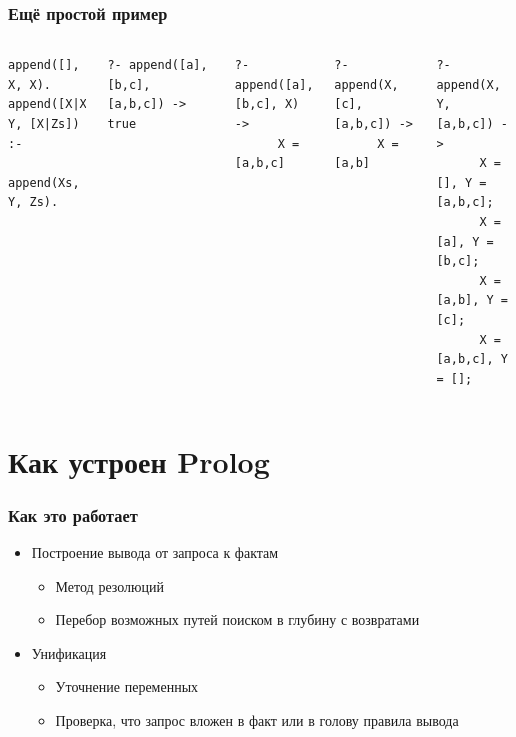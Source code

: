 \documentclass{../../slides-style}
\begin{document}
    \begin{frame}[fragile]
        \frametitle{Ещё простой пример}
        \begin{columns}
            \begin{verbatim}
append([], X, X).
append([X|Xs], Y, [X|Zs]) :-
  append(Xs, Y, Zs).
            \end{verbatim}
            \pause
            \vspace{2mm}
            \begin{verbatim}
?- append([a], [b,c], [a,b,c]) -> true
            \end{verbatim}
            \pause
            \vspace{2mm}
            \begin{verbatim}
?- append([a], [b,c], X) -> 
      X = [a,b,c]
            \end{verbatim}
            \pause
            \vspace{2mm}
            \begin{verbatim}
?- append(X, [c], [a,b,c]) ->
      X = [a,b]
            \end{verbatim}
            \pause
            \vspace{2mm}
            \begin{verbatim}
?- append(X, Y, [a,b,c]) ->
      X = [], Y = [a,b,c];
      X = [a], Y = [b,c];
      X = [a,b], Y = [c];
      X = [a,b,c], Y = [];
            \end{verbatim}
        \end{columns}
    \end{frame}

\section{Как устроен Prolog}

    \begin{frame}
        \frametitle{Как это работает} 
        \begin{itemize}
            \item Построение вывода от запроса к фактам 
            \begin{itemize}
                \item Метод резолюций
                \item Перебор возможных путей поиском в глубину с возвратами
            \end{itemize}
            \vspace{2mm}
            \item Унификация
            \begin{itemize}
                \item Уточнение переменных
                \item Проверка, что запрос вложен в факт или в голову правила вывода
            \end{itemize}
        \end{itemize}
    \end{frame}
\end{document}
